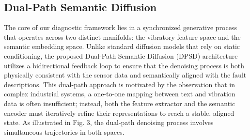 \subsection{Dual-Path Semantic Diffusion}
\label{sec:dual_path}

The core of our diagnostic framework lies in a synchronized generative process that operates across two distinct manifolds: the vibratory feature space and the semantic embedding space. Unlike standard diffusion models that rely on static conditioning, the proposed Dual-Path Semantic Diffusion (DPSD) architecture utilizes a bidirectional feedback loop to ensure that the denoising process is both physically consistent with the sensor data and semantically aligned with the fault descriptions. This dual-path approach is motivated by the observation that in complex industrial systems, a one-to-one mapping between text and vibration data is often insufficient; instead, both the feature extractor and the semantic encoder must iteratively refine their representations to reach a stable, aligned state. As illustrated in Fig. 3, the dual-path denoising process involves simultaneous trajectories in both spaces.

